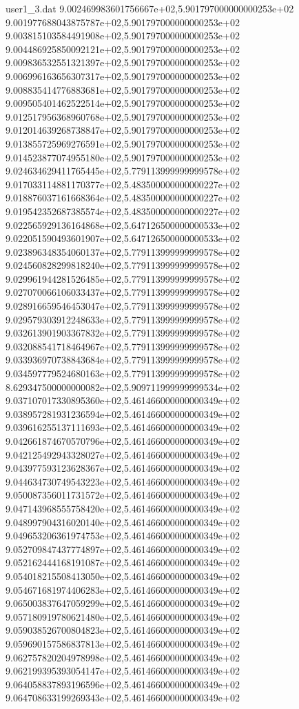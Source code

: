 \begin{filecontents}{user1_3.dat}
9.002469983601756667e+02,5.901797000000000253e+02
9.001977688043875787e+02,5.901797000000000253e+02
9.003815103584491908e+02,5.901797000000000253e+02
9.004486925850092121e+02,5.901797000000000253e+02
9.009836532551321397e+02,5.901797000000000253e+02
9.006996163656307317e+02,5.901797000000000253e+02
9.008835414776883681e+02,5.901797000000000253e+02
9.009505401462522514e+02,5.901797000000000253e+02
9.012517956368960768e+02,5.901797000000000253e+02
9.012014639268738847e+02,5.901797000000000253e+02
9.013855725969276591e+02,5.901797000000000253e+02
9.014523877074955180e+02,5.901797000000000253e+02
9.024634629411765445e+02,5.779113999999999578e+02
9.017033114881170377e+02,5.483500000000000227e+02
9.018876037161668364e+02,5.483500000000000227e+02
9.019542352687385574e+02,5.483500000000000227e+02
9.022565929136164868e+02,5.647126500000000533e+02
9.022051590493601907e+02,5.647126500000000533e+02
9.023896348354060137e+02,5.779113999999999578e+02
9.024560828299818240e+02,5.779113999999999578e+02
9.029961944281526485e+02,5.779113999999999578e+02
9.027070066106033437e+02,5.779113999999999578e+02
9.028916659546453047e+02,5.779113999999999578e+02
9.029579303912248633e+02,5.779113999999999578e+02
9.032613901903367832e+02,5.779113999999999578e+02
9.032088541718464967e+02,5.779113999999999578e+02
9.033936970738843684e+02,5.779113999999999578e+02
9.034597779524680163e+02,5.779113999999999578e+02
8.629347500000000082e+02,5.909711999999999534e+02
9.037107017330895360e+02,5.461466000000000349e+02
9.038957281931236594e+02,5.461466000000000349e+02
9.039616255137111693e+02,5.461466000000000349e+02
9.042661874670570796e+02,5.461466000000000349e+02
9.042125492943328027e+02,5.461466000000000349e+02
9.043977593123628367e+02,5.461466000000000349e+02
9.044634730749543223e+02,5.461466000000000349e+02
9.050087356011731572e+02,5.461466000000000349e+02
9.047143968555758420e+02,5.461466000000000349e+02
9.048997904316020140e+02,5.461466000000000349e+02
9.049653206361974753e+02,5.461466000000000349e+02
9.052709847437774897e+02,5.461466000000000349e+02
9.052162444168191087e+02,5.461466000000000349e+02
9.054018215508413050e+02,5.461466000000000349e+02
9.054671681974406283e+02,5.461466000000000349e+02
9.065003837647059299e+02,5.461466000000000349e+02
9.057180919780621480e+02,5.461466000000000349e+02
9.059038526700804823e+02,5.461466000000000349e+02
9.059690157586837813e+02,5.461466000000000349e+02
9.062757820204978998e+02,5.461466000000000349e+02
9.062199395393054147e+02,5.461466000000000349e+02
9.064058837893196596e+02,5.461466000000000349e+02
9.064708633199269343e+02,5.461466000000000349e+02

\end{filecontents}
